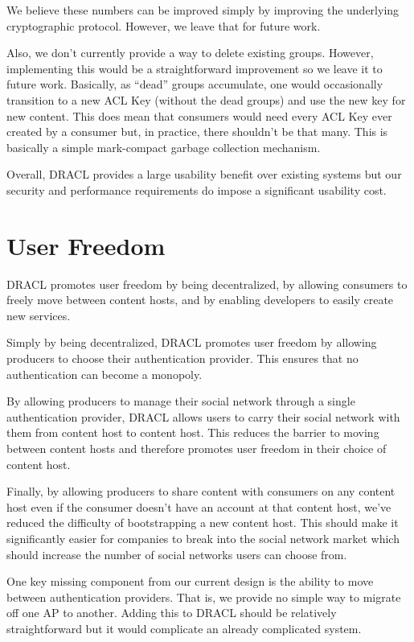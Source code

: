 \documentclass[pdftex,12pt,a4papaer,twoside,notitlepage]{report}
\begin{document}
We believe these numbers can be improved simply by improving the underlying
cryptographic protocol. However, we leave that for future work.

Also, we don't currently provide a way to delete existing groups. However,
implementing this would be a straightforward improvement so we leave it to
future work. Basically, as ``dead'' groups accumulate, one would occasionally
transition to a new ACL Key (without the dead groups) and use the new key for
new content. This does mean that consumers would need every ACL Key ever created
by a consumer but, in practice, there shouldn't be that many. This is basically
a simple mark-compact garbage collection mechanism.

Overall, DRACL provides a large usability benefit over existing systems but our
security and performance requirements do impose a significant usability cost.

\section{User Freedom}

DRACL promotes user freedom by being decentralized, by allowing consumers to
freely move between content hosts, and by enabling developers to easily create
new services.

Simply by being decentralized, DRACL promotes user freedom by allowing producers
to choose their authentication provider. This ensures that no authentication can
become a monopoly.

By allowing producers to manage their social network through a single
authentication provider, DRACL allows users to carry their social network with
them from content host to content host. This reduces the barrier to moving
between content hosts and therefore promotes user freedom in their choice of
content host.

Finally, by allowing producers to share content with consumers on any content
host even if the consumer doesn't have an account at that content host, we've
reduced the difficulty of bootstrapping a new content host. This should make it
significantly easier for companies to break into the social network market which
should increase the number of social networks users can choose from.

One key missing component from our current design is the ability to move between
authentication providers. That is, we provide no simple way to migrate off one
AP to another. Adding this to DRACL should be relatively straightforward but it
would complicate an already complicated system.
\end{document}
